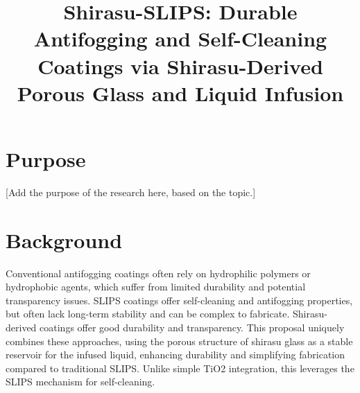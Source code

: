 \documentclass{article}
\title{Shirasu-SLIPS: Durable Antifogging and Self-Cleaning Coatings via Shirasu-Derived Porous Glass and Liquid Infusion}
\author{}
\date{}
\begin{document}
\maketitle
\section{Purpose}
[Add the purpose of the research here, based on the topic.]

\section{Background}
Conventional antifogging coatings often rely on hydrophilic polymers or hydrophobic agents, which suffer from limited durability and potential transparency issues. SLIPS coatings offer self-cleaning and antifogging properties, but often lack long-term stability and can be complex to fabricate. Shirasu-derived coatings offer good durability and transparency. This proposal uniquely combines these approaches, using the porous structure of shirasu glass as a stable reservoir for the infused liquid, enhancing durability and simplifying fabrication compared to traditional SLIPS. Unlike simple TiO2 integration, this leverages the SLIPS mechanism for self-cleaning.
\end{document}
